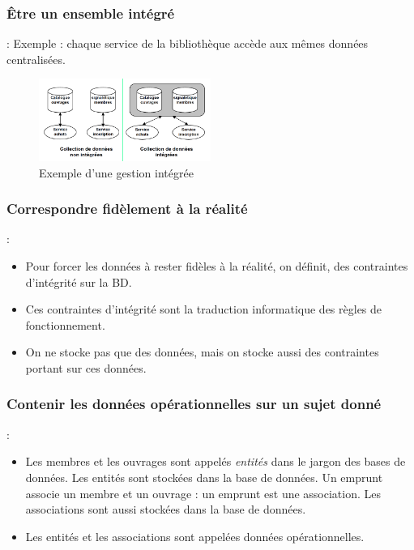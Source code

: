 \documentclass[10pt]{beamer}
\begin{document}
\subsubsection{Être un ensemble intégré}
\begin{frame}{\subsecname : \subsubsecname}
    Exemple : chaque service de la bibliothèque accède aux mêmes données centralisées.
    \begin{figure}[H]
        \begin{center}
            \includegraphics[width=0.5\textwidth]{../assets/img/etre_un_ensemble_integre.png}
            \caption{Exemple d'une gestion intégrée}
            \label{Fig:new-etre_un_ensemble_integre}
        \end{center}
    \end{figure}
\end{frame}

\subsubsection{Correspondre fidèlement à la réalité}
\begin{frame}{\subsecname : \subsubsecname}
    \begin{itemize}
        \item Pour forcer les données à rester fidèles à la réalité, on définit, des contraintes d’intégrité sur la BD.
        \item Ces contraintes d’intégrité sont la traduction informatique des règles de fonctionnement.
        \item On ne stocke pas que des données, mais on stocke aussi des contraintes portant sur ces données.
    \end{itemize}
\end{frame}

\subsubsection{Contenir les données opérationnelles sur un sujet donné}
\begin{frame}{\subsecname : \subsubsecname}
    \begin{itemize}
        \item Les membres et les ouvrages sont appelés \emph{entités} dans le jargon des bases de données. Les entités sont stockées dans la base de données. Un emprunt associe un membre et un ouvrage : un emprunt est une association. Les associations sont aussi stockées dans la base de données.
        \item Les entités et les associations sont appelées données opérationnelles.
    \end{itemize}
\end{frame}
\end{document}
